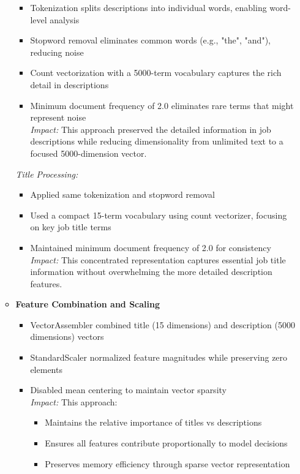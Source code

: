 \documentclass[9pt]{article}
\begin{document}
\begin{enumerate}
\begin{itemize}
\begin{itemize}
          \item Tokenization splits descriptions into individual words, enabling word-level analysis
          \item Stopword removal eliminates common words (e.g., "the", "and"), reducing noise
          \item Count vectorization with a 5000-term vocabulary captures the rich detail in descriptions
          \item Minimum document frequency of 2.0 eliminates rare terms that might represent noise
          \\ 
          \textit{Impact:} This approach preserved the detailed information in job descriptions while reducing dimensionality from unlimited text to a focused 5000-dimension vector.
      \end{itemize}
      \textit{Title Processing:}
      \begin{itemize}
          \item Applied same tokenization and stopword removal
          \item Used a compact 15-term vocabulary using count vectorizer, focusing on key job title terms
          \item Maintained minimum document frequency of 2.0 for consistency
          \\ 
          \textit{Impact:} This concentrated representation captures essential job title information without overwhelming the more detailed description features.
      \end{itemize}
      \item \textbf{Feature Combination and Scaling}
      \begin{itemize}
          \item VectorAssembler combined title (15 dimensions) and description (5000 dimensions) vectors
          \item StandardScaler normalized feature magnitudes while preserving zero elements
          \item Disabled mean centering to maintain vector sparsity
          \\
          \textit{Impact:} This approach:
          \begin{itemize}
              \item Maintains the relative importance of titles vs descriptions
              \item Ensures all features contribute proportionally to model decisions
              \item Preserves memory efficiency through sparse vector representation
          \end{itemize}
      \end{itemize}
  \end{itemize}


\end{enumerate}
\end{document}
